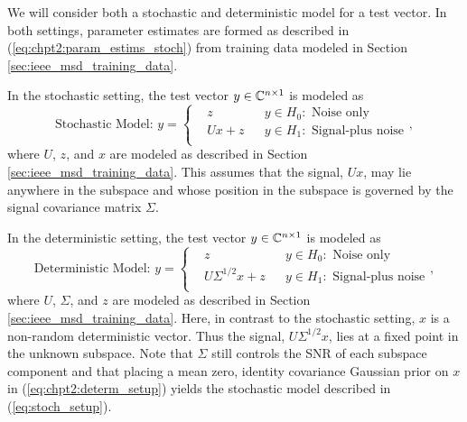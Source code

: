 We will consider both a stochastic and deterministic model for a test vector. In both settings, parameter estimates are formed as described in (\ref{eq:chpt2:param_estims_stoch}) from training data modeled in Section \ref{sec:ieee_msd_training_data}.

In the stochastic setting, the test vector $y\in\mathbb{C}^{n\times 1}$ is modeled as
\small\begin{equation}\label{eq:stoch_setup}
\text{Stochastic Model: }y=\left\{
\begin{aligned}
&z
&& y\in H_0:\text{ Noise only}\\
&Ux+z
&& y\in H_1:\text{ Signal-plus noise}\\
\end{aligned}\right. ,
\end{equation}\normalsize
where $U$, $z$, and $x$ are modeled as described in Section \ref{sec:ieee_msd_training_data}. This assumes that the signal, $Ux$, may lie anywhere in the subspace and whose position in the subspace is governed by the signal covariance matrix $\Sigma$.

In the deterministic setting, the test vector $y\in\mathbb{C}^{n\times 1}$ is modeled as
\small\begin{equation}\label{eq:chpt2:determ_setup}
\text{Deterministic Model: }y=\left\{
\begin{aligned}
&z
&& y\in H_0:\text{ Noise only}\\
&U\Sigma^{1/2} x+z
&& y\in H_1:\text{ Signal-plus noise}\\
\end{aligned}\right. ,
\end{equation}\normalsize
where $U$, $\Sigma$, and $z$ are modeled as described in Section \ref{sec:ieee_msd_training_data}. Here, in contrast to the stochastic setting, $x$ is a non-random deterministic vector. Thus the signal, $U\Sigma^{1/2}x$, lies at a fixed point in the unknown subspace. Note that $\Sigma$ still controls the SNR of each subspace component and that placing a mean zero, identity covariance Gaussian prior on $x$ in (\ref{eq:chpt2:determ_setup}) yields the stochastic model described in (\ref{eq:stoch_setup}).
